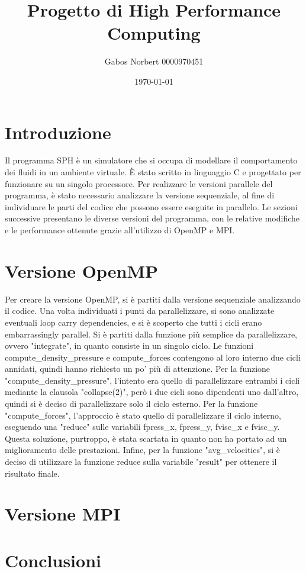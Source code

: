 \documentclass[a4paper,12pt, oneside]{article}
\title{Progetto di High Performance Computing}
\author{Gabos Norbert 0000970451}
\date{\today}
\begin{document}
\maketitle

\section{Introduzione}

Il programma SPH è un simulatore che si occupa di modellare il comportamento dei fluidi in un
ambiente virtuale. È stato scritto in linguaggio C e progettato per funzionare su un singolo
processore. Per realizzare le versioni parallele del programma, è stato necessario analizzare
la versione sequenziale, al fine di individuare le parti del codice che possono essere eseguite
in parallelo. Le sezioni successive presentano le diverse versioni del programma, con le
relative modifiche e le performance ottenute grazie all'utilizzo di OpenMP e MPI.

\section{Versione OpenMP}

Per creare la versione OpenMP, si è partiti dalla versione sequenziale analizzando il codice.
Una volta individuati i punti da parallelizzare, si sono analizzate eventuali loop carry
dependencies, e si è scoperto che tutti i cicli erano embarrassingly parallel. Si è partiti
dalla funzione più semplice da parallelizzare, ovvero "integrate", in quanto consiste in un
singolo ciclo. Le funzioni compute_density_pressure e compute_forces contengono al loro
interno due cicli annidati, quindi hanno richiesto un po' più di attenzione.
Per la funzione "compute_density_pressure", l'intento era quello di parallelizzare entrambi
i cicli mediante la clausola "collapse(2)", però i due cicli sono dipendenti uno dall'altro,
quindi si è deciso di parallelizzare solo il ciclo esterno. Per la funzione "compute_forces",
l'approccio è stato quello di parallelizzare il ciclo interno, eseguendo una "reduce" sulle
variabili fpress_x, fpress_y, fvisc_x e fvisc_y. Questa soluzione, purtroppo, è stata scartata
in quanto non ha portato ad un miglioramento delle prestazioni.
Infine, per la funzione "avg_velocities", si è deciso di utilizzare la funzione reduce sulla
variabile "result" per ottenere il risultato finale.

\section{Versione MPI}
\section{Conclusioni}
\end{document}

